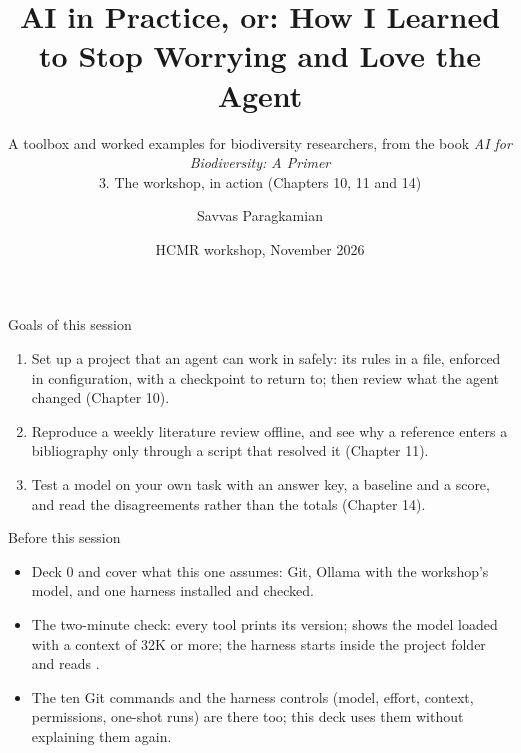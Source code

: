 \documentclass[11pt,aspectratio=169]{beamer}
\title[AI in Practice 3]{AI in Practice, or: How I Learned to Stop Worrying and Love the Agent}
\subtitle{A toolbox and worked examples for biodiversity researchers, from the book \emph{AI for Biodiversity: A Primer}\\[0.6em] 3. The workshop, in action (Chapters 10, 11 and 14)}
\author{Savvas Paragkamian}
\institute{Hellenic Centre for Marine Research \\ KYBELE and ELIXIR-GR}
\date{HCMR workshop, November 2026}
\begin{document}
\begin{frame}[plain]
  \titlepage
\end{frame}

\begin{frame}{Goals of this session}
  \begin{enumerate}
    \item Set up a project that an agent can work in safely: its rules in a file, enforced in configuration, with a checkpoint to return to; then review what the agent changed (Chapter 10).
    \item Reproduce a weekly literature review offline, and see why a reference enters a bibliography only through a script that resolved it (Chapter 11).
    \item Test a model on your own task with an answer key, a baseline and a score, and read the disagreements rather than the totals (Chapter 14).
  \end{enumerate}
\end{frame}

\begin{frame}{Before this session}
  \begin{itemize}
    \item Deck 0 and  cover what this one assumes:
      Git, Ollama with the workshop's model, and one harness installed and
      checked.
    \item The two-minute check: every tool prints its version;
       shows the model loaded with a context of 32K or more;
      the harness starts inside the project folder and reads
      .
    \item The ten Git commands and the harness controls (model, effort,
      context, permissions, one-shot runs) are there too; this deck uses them
      without explaining them again.
  \end{itemize}
\end{frame}
\end{document}
